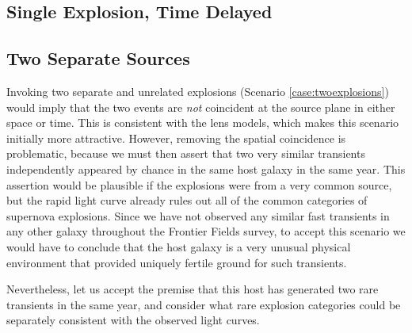\subsection{Single Explosion, Time Delayed}




\subsection{Two Separate Sources}

Invoking two separate and unrelated explosions (Scenario
\ref{case:twoexplosions}) would imply that the two events are {\it
  not} coincident at the source plane in either space or time.  This
is consistent with the lens models, which makes this scenario
initially more attractive.  However, removing the spatial coincidence
is problematic, because we must then assert that two very similar
transients independently appeared by chance in the same host galaxy in
the same year.  This assertion would be plausible if the explosions
were from a very common source, but the rapid light curve already
rules out all of the common categories of supernova explosions.  Since
we have not observed any similar fast transients in any other galaxy
throughout the Frontier Fields survey, to accept this scenario we
would have to conclude that the \spock host galaxy is a very unusual
physical environment that provided uniquely fertile ground for such
transients.






Nevertheless, let us accept the premise that this host has generated
two rare transients in the same year, and consider what rare
explosion categories could be separately consistent with the observed
light curves.

